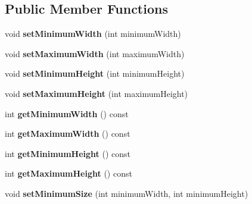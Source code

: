 \subsection*{Public Member Functions}
\begin{DoxyCompactItemize}
\item 
void {\bfseries set\+Minimum\+Width} (int minimum\+Width)\hypertarget{class_resizable_child_a43531c929c933e13b16f15d8d5b966e7}{}\label{class_resizable_child_a43531c929c933e13b16f15d8d5b966e7}

\item 
void {\bfseries set\+Maximum\+Width} (int maximum\+Width)\hypertarget{class_resizable_child_af320c3d8d97e1a29871b83a161970530}{}\label{class_resizable_child_af320c3d8d97e1a29871b83a161970530}

\item 
void {\bfseries set\+Minimum\+Height} (int minimum\+Height)\hypertarget{class_resizable_child_a9a25c9c476e606c79a091ea171fde10d}{}\label{class_resizable_child_a9a25c9c476e606c79a091ea171fde10d}

\item 
void {\bfseries set\+Maximum\+Height} (int maximum\+Height)\hypertarget{class_resizable_child_a2b7b79d443e5d8f9220f9fa2e5a48e3d}{}\label{class_resizable_child_a2b7b79d443e5d8f9220f9fa2e5a48e3d}

\item 
int {\bfseries get\+Minimum\+Width} () const \hypertarget{class_resizable_child_a799c8cf06801b7da7fd6d987892740e1}{}\label{class_resizable_child_a799c8cf06801b7da7fd6d987892740e1}

\item 
int {\bfseries get\+Maximum\+Width} () const \hypertarget{class_resizable_child_a78a85e1a87e5d3c0071c8eb6aa673aab}{}\label{class_resizable_child_a78a85e1a87e5d3c0071c8eb6aa673aab}

\item 
int {\bfseries get\+Minimum\+Height} () const \hypertarget{class_resizable_child_a3dc554161d4b994494326227a96a644c}{}\label{class_resizable_child_a3dc554161d4b994494326227a96a644c}

\item 
int {\bfseries get\+Maximum\+Height} () const \hypertarget{class_resizable_child_afedf9f9fbe96c0bc1a0713b65b1cf55e}{}\label{class_resizable_child_afedf9f9fbe96c0bc1a0713b65b1cf55e}

\item 
void {\bfseries set\+Minimum\+Size} (int minimum\+Width, int minimum\+Height)\hypertarget{class_resizable_child_a9859e8527b8f19602eedbd57834460f8}{}\label{class_resizable_child_a9859e8527b8f19602eedbd57834460f8}


\end{DoxyCompactItemize}
